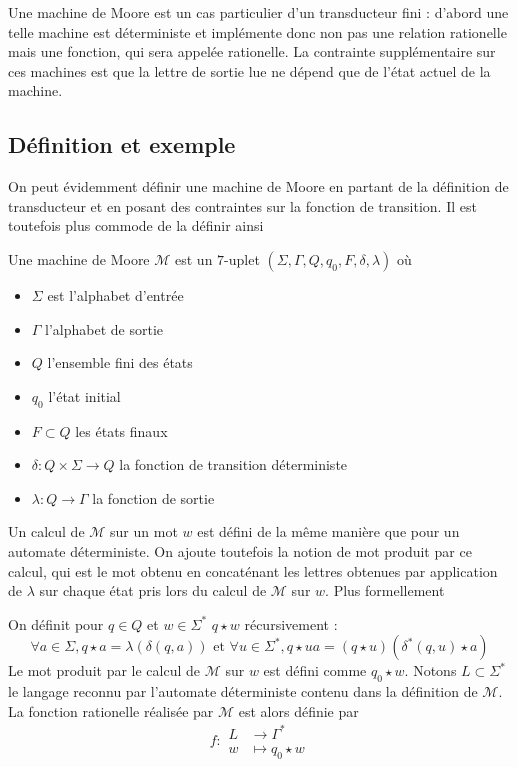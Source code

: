 \documentclass{scrartcl}
\begin{document}
\begin{flushleft}
Une machine de Moore est un cas particulier d'un transducteur fini : d'abord une telle machine est déterministe
et implémente donc non pas une relation rationelle mais une fonction, qui sera appelée rationelle. La contrainte
supplémentaire sur ces machines est que la lettre de sortie lue ne dépend que de l'état actuel de la machine.

\subsection{Définition et exemple}

On peut évidemment définir une machine de Moore en partant de la définition de transducteur et en posant des
contraintes sur la fonction de transition. Il est toutefois plus commode de la définir ainsi

\begin{define}
    Une machine de Moore $\mathcal{M}$ est un $7$-uplet $(\Sigma, \Gamma, Q, q_0, F, \delta, \lambda)$ où
    \begin{itemize}
        \item $\Sigma$ est l'alphabet d'entrée
        \item $\Gamma$ l'alphabet de sortie
        \item $Q$ l'ensemble fini des états
        \item $q_0$ l'état initial
        \item $F \subset Q$ les états finaux
        \item $\delta : Q \times \Sigma \rightarrow Q$ la fonction de transition déterministe
        \item $\lambda : Q \rightarrow \Gamma$ la fonction de sortie
    \end{itemize}
\end{define}

Un calcul de $\mathcal{M}$ sur un mot $w$ est défini de la même manière que pour un automate déterministe. On ajoute
toutefois la notion de mot produit par ce calcul, qui est le mot obtenu en concaténant les lettres obtenues
par application de $\lambda$ sur chaque état pris lors du calcul de $\mathcal{M}$ sur $w$. Plus formellement

\begin{define}
    On définit pour $q \in Q$ et $w \in \Sigma^*$ $q \star w$ récursivement :
    \[ \forall a \in \Sigma, q \star a = \lambda(\delta(q, a)) \text{ et } \forall u \in \Sigma^*,
    q \star ua = (q \star u)(\delta^*(q, u) \star a) \]
    Le mot produit par le calcul de $\mathcal{M}$ sur $w$ est défini comme $q_0 \star w$. Notons $L \subset \Sigma^*$
    le langage reconnu par l'automate déterministe contenu dans la définition de $\mathcal{M}$. La fonction rationelle
    réalisée par $\mathcal{M}$ est alors définie par
    \[ f : \begin{array}{cl}
        L &\longrightarrow \Gamma^*\\
        w &\longmapsto q_0 \star w
    \end{array} \]
\end{define}


\end{flushleft}
\end{document}
